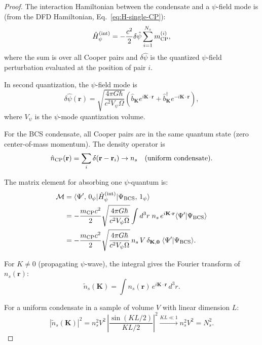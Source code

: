 \documentclass[12pt,aps,prd,twocolumn,superscriptaddress,nofootinbib]{revtex4-2}
\newcommand{\psifield}{\psi}
\begin{document}
\begin{proof}
The interaction Hamiltonian between the condensate and a $\psi$-field
mode is (from the DFD Hamiltonian, Eq.~\eqref{eq:H-single-CP}):
\begin{equation}\label{eq:H-int-condensate}
\hat{H}_\psi^{(\rm int)} = -\frac{c^2}{2}\delta\hat\psifield
\sum_{i=1}^{N_s} m_{\rm CP}^{(i)},
\end{equation}
where the sum is over all Cooper pairs and $\delta\hat\psifield$ is
the quantized $\psi$-field perturbation evaluated at the position of
pair $i$.

In second quantization, the $\psi$-field mode is
\begin{equation}
\delta\hat\psifield(\mathbf{r}) = \sqrt{\frac{4\pi G\hbar}{c^2 V_\psi \Omega}}
\left(\hat{b}_\mathbf{K} e^{i\mathbf{K}\cdot\mathbf{r}}
+ \hat{b}^\dagger_\mathbf{K} e^{-i\mathbf{K}\cdot\mathbf{r}}\right),
\end{equation}
where $V_\psi$ is the $\psi$-mode quantization volume.

For the BCS condensate, all Cooper pairs are in the same quantum state
(zero center-of-mass momentum). The density operator is
\begin{equation}
\hat{n}_{\rm CP}(\mathbf{r}) = \sum_i \delta(\mathbf{r}-\mathbf{r}_i)
\to n_s\quad\text{(uniform condensate)}.
\end{equation}

The matrix element for absorbing one $\psi$-quantum is:
\begin{align}
\mathcal{M} &= \langle\Psi',\,0_\psi|\hat{H}_\psi^{(\rm int)}
|\Psi_{\rm BCS},\,1_\psi\rangle
\notag \\
&= -\frac{m_{\rm CP}c^2}{2}
\sqrt{\frac{4\pi G\hbar}{c^2 V_\psi\Omega}}
\int d^3r\;n_s\,e^{i\mathbf{K}\cdot\mathbf{r}}
\langle\Psi'|\Psi_{\rm BCS}\rangle
\notag \\
&= -\frac{m_{\rm CP}c^2}{2}
\sqrt{\frac{4\pi G\hbar}{c^2 V_\psi\Omega}}\,n_s\,V\,
\delta_{\mathbf{K},\mathbf{0}}\;\langle\Psi'|\Psi_{\rm BCS}\rangle.
\label{eq:matrix-element}
\end{align}

For $K \neq 0$ (propagating $\psi$-wave), the integral gives the
Fourier transform of $n_s(\mathbf{r})$:
\begin{equation}
\tilde{n}_s(\mathbf{K}) = \int n_s(\mathbf{r})\,
e^{i\mathbf{K}\cdot\mathbf{r}}\,d^3r.
\end{equation}

For a uniform condensate in a sample of volume $V$ with linear
dimension $L$:
\begin{equation}
|\tilde{n}_s(\mathbf{K})|^2 = n_s^2 V^2\,
\left|\frac{\sin(KL/2)}{KL/2}\right|^2
\xrightarrow{KL \ll 1} n_s^2 V^2 = N_s^2.
\end{equation}


\end{proof}
\end{document}
